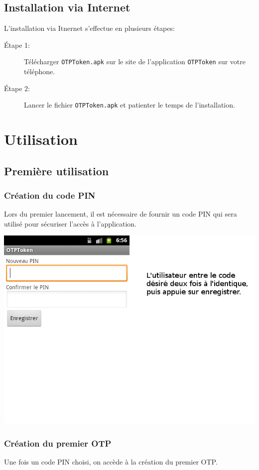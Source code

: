 \documentclass{../../../../res/univ-projet}
\begin{document}
\subsection{Installation via Internet}
L'installation via Itnernet s'effectue en plusieurs étapes:
\newline
\begin{description}
\item[Étape 1:] Télécharger \verb$OTPToken.apk$ sur le site de l'application \verb$OTPToken$ sur votre téléphone.
\item[Étape 2:]  Lancer le fichier \verb$OTPToken.apk$ et patienter le temps de l'installation. \footnotemark[\value{footnote}]
\end{description}
\newpage

\section{Utilisation}
\subsection{Première utilisation}
\subsubsection{Création du code PIN}
Lors du premier lancement, il est nécessaire de fournir un code PIN qui sera utilisé pour sécuriser l'accès à l'application.

\includegraphics[scale=0.5]{enterpin.png}


\subsubsection{Création du premier OTP}
Une fois un code PIN choisi, on accède à la création du premier OTP.
\end{document}
